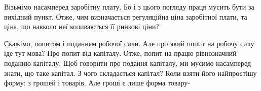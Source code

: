Візьмімо насамперед заробітну плату. Бо і з цього погляду праця мусить
бути за вихідний пункт. Отже, чим визначається регуляційна ціна заробітної
плати, та ціна, що навколо неї коливаються її ринкові ціни?

Скажімо, попитом і поданням робочої сили. Але про який попит на робочу
силу іде тут мова? Про попит від капіталу. Отже, попит на працю рівнозначний
поданню капіталу. Щоб говорити про подання капіталу, ми мусимо
насамперед знати, що таке капітал. З чого складається капітал? Коли взяти
його найпростішу форму: з грошей і товарів. Але гроші є лише форма товару-
